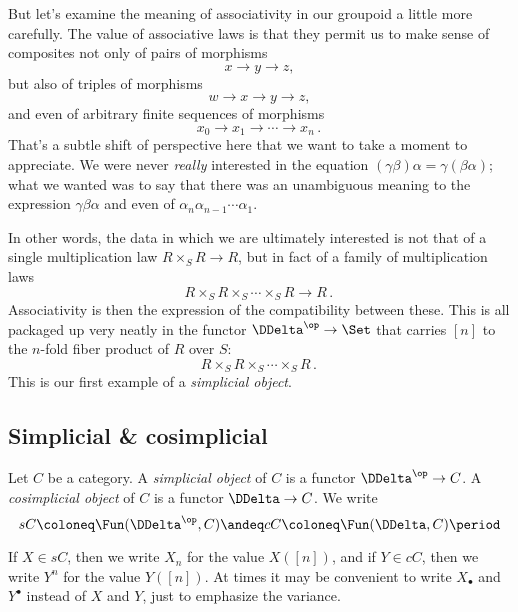 But let's examine the meaning of associativity in our groupoid a little more carefully.
The value of associative laws is that they permit us to make sense of composites not only of pairs of morphisms
\[
  x \to y \to z \comma
\]
but also of triples of morphisms
\[
  w \to x \to y \to z \comma
\]
and even of arbitrary finite sequences of morphisms
\[
  x_0 \to x_1 \to \cdots \to x_n \period
\]
That's a subtle shift of perspective here that we want to take a moment to appreciate.
We were never \emph{really} interested in the equation $(\gamma\beta)\alpha = \gamma(\beta\alpha)$;
what we wanted was to say that there was an unambiguous meaning to the expression $\gamma\beta\alpha$ and even of $\alpha_n \alpha_{n-1} \cdots \alpha_1$.

In other words, the data in which we are ultimately interested is not that of a single multiplication law $R \times_S R \to R$, but in fact of a family of multiplication laws
\[
  R \times_S R \times_S \cdots \times_S R \to R \period
\]
Associativity is then the expression of the compatibility between these.
This is all packaged up very neatly in the functor $\DDelta^{\op} \to \Set$ that carries $[n]$ to the $n$-fold fiber product of $R$ over $S$:
\[
  R \times_S R \times_S \cdots \times_S R \period
\]
This is our first example of a \emph{simplicial object}.

\subsection{Simplicial \& cosimplicial}%
\label{sub:simplicialcosimplicial}

\begin{definition}
  Let $C$ be a category.
  A \emph{simplicial object} of $C$ is a functor $\DDelta^{\op}\to C$.
  A \emph{cosimplicial object} of $C$ is a functor $\DDelta \to C$.
  We write
  \[
    sC \coloneq \Fun(\DDelta^{\op},C)
    \andeq
    cC \coloneq \Fun(\DDelta, C) \period
  \]

  If $X \in sC$, then we write $X_n$ for the value $X([n])$, and
  if $Y \in cC$, then we write $Y^n$ for the value $Y([n])$.
  At times it may be convenient to write $X_\bullet$ and $Y^\bullet$ instead of $X$ and $Y$, just to emphasize the variance.
\end{definition}

